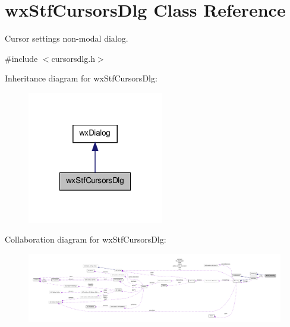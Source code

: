 \hypertarget{classwxStfCursorsDlg}{
\section{wxStfCursorsDlg Class Reference}
\label{classwxStfCursorsDlg}
}


Cursor settings non-\/modal dialog.  




{\ttfamily \#include $<$cursorsdlg.h$>$}



Inheritance diagram for wxStfCursorsDlg:
\nopagebreak
\begin{figure}[H]
\begin{center}
\leavevmode
\includegraphics[width=168pt]{classwxStfCursorsDlg__inherit__graph}
\end{center}
\end{figure}


Collaboration diagram for wxStfCursorsDlg:
\nopagebreak
\begin{figure}[H]
\begin{center}
\leavevmode
\includegraphics[width=400pt]{classwxStfCursorsDlg__coll__graph}
\end{center}
\end{figure}
